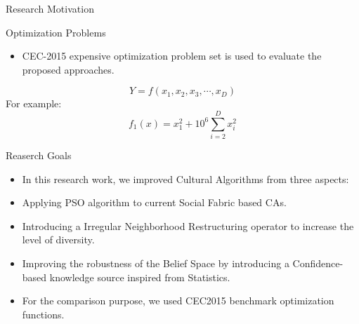 \documentclass[table]{beamer}
\begin{document}
	\begin{frame}{Research Motivation}
		\begin{block}{Optimization Problems}
			\begin{itemize}
				\justifying
				\item CEC-2015 expensive optimization problem set is used to evaluate the proposed approaches. \cite{chen2014problem}
			\end{itemize}
		\end{block}
		\begin{equation}
		Y=f(x_{1}, x_{2}, x_{3}, \cdots, x_{D})
		\end{equation}
		For example: 
		\begin{equation}
		f_{1}(x)=x_{1}^{2}+10^{6}\sum_{i=2}^{D}x_{i}^2
		\end{equation}
		
	\end{frame}
	
	\begin{frame}{Reaserch Goals}
		\begin{block}{}
			\begin{itemize}
				\justifying
				\item In this research work, we improved Cultural Algorithms from three aspects:
				\item Applying PSO algorithm to current Social Fabric based CAs.
				\item Introducing a Irregular Neighborhood Restructuring operator to increase the level of diversity.
				\item Improving the robustness of the Belief Space by introducing a Confidence-based knowledge source inspired from Statistics.
				\item For the comparison purpose, we used CEC2015 benchmark optimization functions.
			\end{itemize}
		\end{block}
	\end{frame}
	
\end{document}
